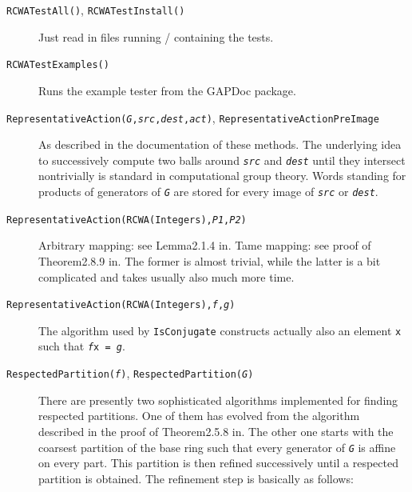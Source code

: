 \documentclass[a4paper,11pt]{report}
\begin{document}
{\begin{description}
\item[{ \texttt{RCWATestAll()}, {\nobreakspace} \texttt{RCWATestInstall()} }]  Just read in files running / containing the tests. 
\item[{ \texttt{RCWATestExamples()} }]  Runs the example tester from the \textsf{GAPDoc} package. 
\item[{ \texttt{RepresentativeAction(\mbox{\texttt{\mdseries\slshape G}},\mbox{\texttt{\mdseries\slshape src}},\mbox{\texttt{\mdseries\slshape dest}},\mbox{\texttt{\mdseries\slshape act}})}, {\nobreakspace} \texttt{RepresentativeActionPreImage} }]  As described in the documentation of these methods. The underlying idea to
successively compute two balls around \mbox{\texttt{\mdseries\slshape src}} and \mbox{\texttt{\mdseries\slshape dest}} until they intersect non\texttt{}trivially is standard in
computational group theory. Words standing for products of generators of \mbox{\texttt{\mdseries\slshape G}} are stored for every image of \mbox{\texttt{\mdseries\slshape src}} or \mbox{\texttt{\mdseries\slshape dest}}. 
\item[{ \texttt{RepresentativeAction(RCWA(Integers),\mbox{\texttt{\mdseries\slshape P1}},\mbox{\texttt{\mdseries\slshape P2}})} }]  Arbitrary mapping: see Lemma{\nobreakspace}2.1.4 in{\nobreakspace}\cite{Kohl05}. Tame mapping: see proof of Theorem{\nobreakspace}2.8.9 in{\nobreakspace}\cite{Kohl05}. The former is almost trivial, while the latter is a bit complicated and
takes usually also much more time. 
\item[{ \texttt{RepresentativeAction(RCWA(Integers),\mbox{\texttt{\mdseries\slshape f}},\mbox{\texttt{\mdseries\slshape g}})} }]  The algorithm used by \texttt{IsConjugate} constructs actually also an element \texttt{x} such that \texttt{\mbox{\texttt{\mdseries\slshape f}}\texttt{}x = \mbox{\texttt{\mdseries\slshape g}}}. 
\item[{ \texttt{RespectedPartition(\mbox{\texttt{\mdseries\slshape f}})}, {\nobreakspace} \texttt{RespectedPartition(\mbox{\texttt{\mdseries\slshape G}})} }]  There are presently two sophisticated algorithms implemented for finding
respected partitions. One of them has evolved from the algorithm described in
the proof of Theorem{\nobreakspace}2.5.8 in{\nobreakspace}\cite{Kohl05}. The other one starts with the coarsest partition of the base ring such that
every generator of \mbox{\texttt{\mdseries\slshape G}} is affine on every part. This partition is then refined successively until a
respected partition is obtained. The refinement step is basically as follows:

\end{description}}
\end{document}
